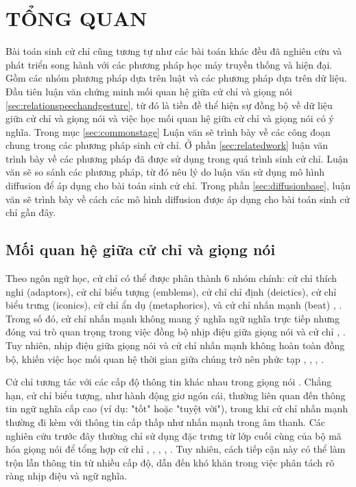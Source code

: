 \chapter{TỔNG QUAN}
\label{Chapter2}

Bài toán sinh cử chỉ cũng tương tự như các bài toán khác đều đã nghiên cứu và phát triển song hành với các phương pháp học máy truyền thống và hiện đại. Gồm các nhóm phương pháp dựa trên luật và các phương pháp dựa trên dữ liệu.  Đầu tiên luận văn chứng minh mối quan hệ giữa cử chỉ và giọng nói \autoref{sec:relationspeechandgesture}, từ đó là tiền đề thể hiện sự đồng bộ về dữ liệu giữa cử chỉ và giọng nói và việc học mối quan hệ giữa cử chỉ và giọng nói có ý nghĩa. Trong mục \autoref{sec:commonstage} Luận văn sẽ trình bày về các công đoạn chung trong các phương pháp sinh cử chỉ.
Ở phần \autoref{sec:relatedwork} luận văn trình bày về các phương pháp đã được sử dụng trong quá trình sinh cử chỉ. Luận văn sẽ so sánh các phương pháp, từ đó nêu lý do luận văn sử dụng mô hình diffusion để áp dụng cho bài toán sinh cử chỉ.
Trong phần \autoref{sec:diffusionbase}, luận văn sẽ trình bày về cách các mô hình diffusion được áp dụng cho bài toán sinh cử chỉ gần đây.

\section{Mối quan hệ giữa cử chỉ và giọng nói}
\label{sec:relationspeechandgesture}

Theo ngôn ngữ học, cử chỉ có thể được phân thành 6 nhóm chính: cử chỉ thích nghi (adaptors), cử chỉ biểu tượng (emblems), cử chỉ chỉ định (deictics), cử chỉ biểu trưng (iconics), cử chỉ ẩn dụ (metaphorics), và cử chỉ nhấn mạnh (beat) \cite{ekman1969repertoire}, \cite{sebeok2011advances}. Trong số đó, cử chỉ nhấn mạnh không mang ý nghĩa ngữ nghĩa trực tiếp nhưng đóng vai trò quan trọng trong việc đồng bộ nhịp điệu giữa giọng nói và cử chỉ \cite{kipp2005gesture}, \cite{sebeok2011advances}. Tuy nhiên, nhịp điệu giữa giọng nói và cử chỉ nhấn mạnh không hoàn toàn đồng bộ, khiến việc học mối quan hệ thời gian giữa chúng trở nên phức tạp \cite{mcclave1994gestural}, \cite{bhattacharya2021speech2affectivegestures}, \cite{kucherenko2020gesticulator}, \cite{yoon2020speech}.

Cử chỉ tương tác với các cấp độ thông tin khác nhau trong giọng nói \cite{sebeok2011advances}. Chẳng hạn, cử chỉ biểu tượng, như hành động giơ ngón cái, thường liên quan đến thông tin ngữ nghĩa cấp cao (ví dụ: "tốt" hoặc "tuyệt vời"), trong khi cử chỉ nhấn mạnh thường đi kèm với thông tin cấp thấp như nhấn mạnh trong âm thanh. Các nghiên cứu trước đây thường chỉ sử dụng đặc trưng từ lớp cuối cùng của bộ mã hóa giọng nói để tổng hợp cử chỉ \cite{alexanderson2020style}, \cite{bhattacharya2021speech2affectivegestures}, \cite{kucherenko2021large}, \cite{qian2021speech}, \cite{yoon2022genea}. Tuy nhiên, cách tiếp cận này có thể làm trộn lẫn thông tin từ nhiều cấp độ, dẫn đến khó khăn trong việc phân tách rõ ràng nhịp điệu và ngữ nghĩa.

